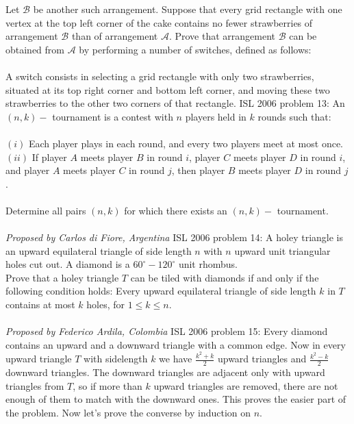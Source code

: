 Let $\mathcal{B}$ be another such arrangement. Suppose that every grid rectangle with one vertex at the top left corner of the cake contains no fewer strawberries of arrangement $\mathcal{B}$ than of arrangement $\mathcal{A}$. Prove that arrangement $\mathcal{B}$ can be obtained from $ \mathcal{A}$ by performing a number of switches, defined as follows: \\\\
A switch consists in selecting a grid rectangle with only two strawberries, situated at its top right corner and bottom left corner, and moving these two strawberries to the other two corners of that rectangle. 
ISL 2006 problem 13:  An $ (n, k) -$ tournament is a contest with $ n$ players held in $ k$ rounds such that: \\\\
$ (i)$ Each player plays in each round, and every two players meet at most once. \\
$ (ii)$ If player $ A$ meets player $ B$ in round $ i$, player $ C$ meets player $ D$ in round $ i$, and player $ A$ meets player $ C$ in round $ j$, then player $ B$ meets player $ D$ in round $ j$. \\\\
Determine all pairs $ (n, k)$ for which there exists an $ (n, k) -$ tournament. \\\\
\textit{Proposed by Carlos di Fiore, Argentina} 
ISL 2006 problem 14:  A holey triangle is an upward equilateral triangle of side length $n$ with $n$ upward unit triangular holes cut out. A diamond is a $60^\circ-120^\circ$ unit rhombus. \\
Prove that a holey triangle $T$ can be tiled with diamonds if and only if the following condition holds: Every upward equilateral triangle of side length $k$ in $T$ contains at most $k$ holes, for $1\leq k\leq n$. \\\\
\textit{Proposed by Federico Ardila, Colombia } 
ISL 2006 problem 15:  Every diamond contains an upward and a downward triangle with a common edge. Now in every upward triangle $ T$ with sidelength $ k$ we have $ \frac{k^2+k}2$ upward triangles and $ \frac{k^2-k}2$ downward triangles. The downward triangles are adjacent only with upward triangles from $ T$, so if more than $ k$ upward triangles are removed, there are not enough of them to match with the downward ones. This proves the easier part of the problem. Now let's prove the converse by induction on $ n$. \\
